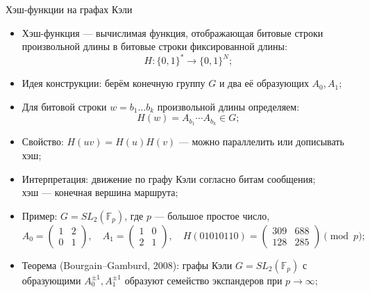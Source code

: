 \documentclass[serif, aspectratio=169]{beamer}
\begin{document}
\begin{frame}{Хэш-функции на графах Кэли}
    \begin{itemize}
        \item Хэш-функция --- вычислимая функция, отображающая битовые строки произвольной длины в битовые строки фиксированной длины:
        \[H\colon\{0,1\}^*\to\{0,1\}^N;\]
        \item Идея конструкции: берём конечную группу $G$ и два её образующих $A_0,A_1$;
        \item Для битовой строки $w=b_1\dots b_k$ произвольной длины определяем:
        \[H(w)=A_{b_1}\cdots A_{b_k}\in G;\]
        \item Свойство: $H(uv)=H(u)H(v)$ --- можно параллелить или дописывать хэш;
        \item Интерпретация: движение по графу Кэли согласно битам сообщения;\\
        хэш --- конечная вершина маршрута;
        \item Пример: $G=SL_2(\mathbb F_p)$, где $p$ --- большое простое число,
        \[
            A_0=\left(\begin{smallmatrix}1&2\\0&1\end{smallmatrix}\right),\quad
            A_1=\left(\begin{smallmatrix}1&0\\2&1\end{smallmatrix}\right),\quad
            H(01010110)=\left(\begin{smallmatrix}309&688\\128&285\end{smallmatrix}\right)\pmod p;
        \]
        \item Теорема (Bourgain--Gamburd, 2008): графы Кэли $G=SL_2(\mathbb F_p)$ с образующими $A_0^{\pm1},A_1^{\pm1}$ образуют семейство экспандеров при $p\to\infty$;
        
    \end{itemize}
\end{frame}
\end{document}
